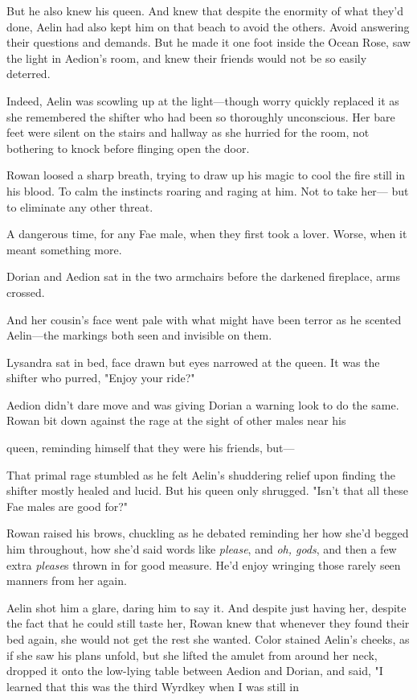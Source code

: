 But he also knew his queen. And knew that despite the enormity of what they'd done, Aelin had also kept him on that beach to avoid the others. Avoid answering their questions and demands. But he made it one foot inside the Ocean Rose, saw the light in Aedion's room, and knew their friends would not be so easily deterred.

Indeed, Aelin was scowling up at the light---though worry quickly replaced it as she remembered the shifter who had been so thoroughly unconscious. Her bare feet were silent on the stairs and hallway as she hurried for the room, not bothering to knock before flinging open the door.

Rowan loosed a sharp breath, trying to draw up his magic to cool the fire still in his blood. To calm the instincts roaring and raging at him. Not to take her--- but to eliminate any other threat.

A dangerous time, for any Fae male, when they first took a lover. Worse, when it meant something more.

Dorian and Aedion sat in the two armchairs before the darkened fireplace, arms crossed.

And her cousin's face went pale with what might have been terror as he scented Aelin---the markings both seen and invisible on them.

Lysandra sat in bed, face drawn but eyes narrowed at the queen. It was the shifter who purred, "Enjoy your ride?"

Aedion didn't dare move and was giving Dorian a warning look to do the same. Rowan bit down against the rage at the sight of other males near his

queen, reminding himself that they were his friends, but---

That primal rage stumbled as he felt Aelin's shuddering relief upon finding the shifter mostly healed and lucid. But his queen only shrugged. "Isn't that all these Fae males are good for?"

Rowan raised his brows, chuckling as he debated reminding her how she'd begged him throughout, how she'd said words like \emph{please}, and
\emph{oh, gods}, and then a few extra \emph{please}s thrown in for good measure. He'd enjoy wringing those rarely seen manners from her again.

Aelin shot him a glare, daring him to say it. And despite just having her, despite the fact that he could still taste her, Rowan knew that whenever they found their bed again, she would not get the rest she wanted. Color stained Aelin's cheeks, as if she saw his plans unfold, but she lifted the amulet from around her neck, dropped it onto the low-lying table between Aedion and Dorian, and said, "I learned that this was the third Wyrdkey when I was still in

